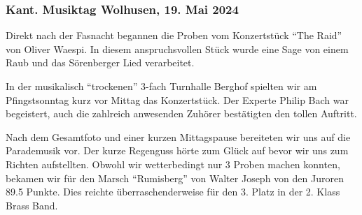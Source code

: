 \begin{history}
    \subsubsection*{Kant. Musiktag Wolhusen, 19. Mai 2024}

    Direkt nach der Fasnacht begannen die Proben vom Konzertstück \enquote{The
        Raid} von Oliver Waespi. In diesem anspruchsvollen Stück wurde eine Sage
    von einem Raub und das Sörenberger Lied verarbeitet.

    In der musikalisch \enquote{trockenen} 3-fach Turnhalle Berghof spielten wir
    am Pfingstsonntag kurz vor Mittag das Konzertstück. Der Experte Philip Bach
    war begeistert, auch die zahlreich anwesenden Zuhörer bestätigten den tollen
    Auftritt.

    Nach dem Gesamtfoto und einer kurzen Mittagspause bereiteten wir uns auf die
    Parademusik vor. Der kurze Regenguss hörte zum Glück auf bevor wir uns zum
    Richten aufstellten. Obwohl wir wetterbedingt nur 3 Proben machen konnten,
    bekamen wir für den Marsch \enquote{Rumisberg} von Walter Joseph von den
    Juroren 89.5 Punkte. Dies reichte überraschenderweise für den 3. Platz in
    der 2. Klass Brass Band.

\end{history}